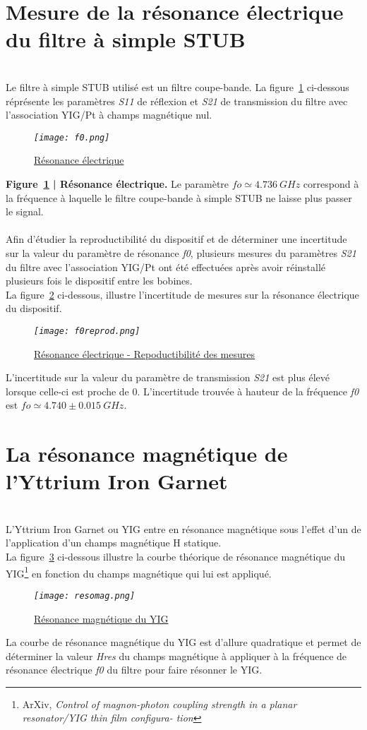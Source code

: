 \documentclass[12pt,fleqn]{book} %
\begin{document}
\section{Mesure de la résonance électrique du filtre à simple STUB}
~\\\indent Le filtre à simple STUB utilisé est un filtre coupe-bande. La figure~\underline{\color{blue}\ref{fo}} ci-dessous réprésente les paramètres \emph{S11} de réflexion et \emph{S21} de transmission du filtre avec l'association YIG/Pt à champs magnétique nul.
\begin{figure}[H]
	\centering
	\itshape
	\texttt{[image: f0.png]}
	\caption{\label{fo} \underline{Résonance électrique}}
\end{figure}
\noindent\footnotesize  \textbf{Figure~\underline{\color{blue}\ref{fo}} | Résonance électrique.} Le paramètre $ fo\simeq4.736\ GHz$ correspond à la fréquence à laquelle le filtre coupe-bande à simple STUB ne laisse plus passer le signal.
~\\\\
\normalsize Afin d'étudier la reproductibilité du dispositif et de déterminer une incertitude sur la valeur du paramètre de résonance \emph{f0}, plusieurs mesures du paramètres \emph{S21} du filtre avec l'association YIG/Pt ont été effectuées après avoir réinstallé plusieurs fois le dispositif entre les bobines. 
~\\La figure~\underline{\color{blue}\ref{foreprod}} ci-dessous, illustre l'incertitude de mesures sur la résonance électrique du dispositif.
\begin{figure}[H]
	\centering
	\itshape
	\texttt{[image: f0reprod.png]}
	\caption{\label{foreprod} \underline{Résonance électrique - Repoductibilité des mesures}}
\end{figure}
\noindent L'incertitude sur la valeur du paramètre de transmission \emph{\emph{S21}} est plus élevé lorsque celle-ci est proche de 0. L'incertitude trouvée à hauteur de la fréquence \emph{f0} est $ fo\simeq4.740\pm0.015\ GHz$.
\section{La résonance magnétique de l'Yttrium Iron Garnet}
~\\\indent L'Yttrium Iron Garnet ou YIG entre en résonance magnétique sous l'effet d'un de l'application d'un champs magnétique H statique. 
~\\La figure~\underline{\color{blue}\ref{resomag}} ci-dessous illustre la courbe théorique de résonance magnétique du YIG\footnote{ArXiv, \emph{Control of magnon-photon coupling strength in a planar resonator/YIG thin film configura-
tion}} en fonction du champs magnétique qui lui est appliqué.
\begin{figure}[H]
	\centering
	\itshape
	\texttt{[image: resomag.png]}
	\caption{\label{resomag} \underline{Résonance magnétique du YIG}}
\end{figure}
\noindent La courbe de résonance magnétique du YIG est d'allure quadratique et permet de déterminer la valeur \emph{Hres} du champs magnétique à appliquer à la fréquence de résonance électrique \emph{f0} du filtre pour faire résonner le YIG. 
\end{document}
